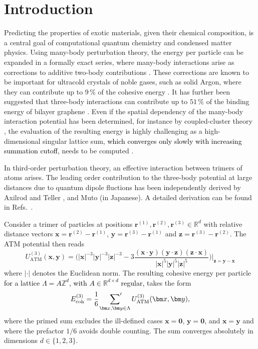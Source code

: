 \documentclass[]{amsart}
\numberwithin{mythm}{section}
\newcommand{\new}[1]{{\textcolor{black}{#1}}}
\begin{document}
\maketitle

\section{Introduction}

Predicting the properties of exotic materials, given their chemical composition, is a central goal of computational quantum chemistry and condensed matter physics. Using many-body perturbation theory, the energy per particle can be expanded in a formally exact series, where many-body interactions arise as corrections to additive two-body contributions \cite{muser2023interatomic}. These corrections are known to be important for ultracold crystals of noble gases, such as solid Argon, where they can contribute up to 9\,\% of the cohesive energy \cite{schwerdtfeger2016towards}. It has further been suggested that three-body interactions can contribute up to $51\,\%$ of the binding energy of bilayer graphene \cite{anatole2010two}. Even if the spatial dependency of the many-body interaction potential has been determined, for instance by coupled-cluster theory \cite{smits2020first}, the evaluation of the resulting energy is highly challenging as a high-dimensional singular lattice sum, \new{which converges only slowly with increasing summation cutoff,} needs to be computed \cite{hermannConvergenceManybodyExpansion2007}.

In third-order perturbation theory, an effective interaction between trimers of atoms arises. 
The leading order contribution to the three-body potential at large distances due to quantum dipole fluctions has been independently derived by Axilrod and Teller 
\cite{axilrod1943interaction}, and Muto \cite{muto1943force} (in Japanese). A detailed derivation can be found in Refs.~\cite{bade1957drude,axilrod1951triple,bell1970multipolar}.
\begin{definition}
\label{def:atm}
Consider a trimer of particles at positions $\bm r^{(1)},\bm r^{(2)},\bm r^{(3)}\in \mathds R^d$ with relative distance vectors $\bm x= \bm r^{(2)}-\bm r^{(1)}$, $\bm y= \bm r^{(3)}-\bm r^{(1)}$ and $\bm z=\bm r^{(3)}-\bm r^{(2)}$. The ATM potential then reads
\[
U^{(3)}_{\mathrm{ATM}}(\bm x,\bm y) = \bigg(\vert \bm x \vert^{-3}\vert \bm y \vert^{-3}\vert \bm  z\vert^{-3} - 3 \frac{(\bm x\cdot \bm y)(\bm y\cdot \bm z)(\bm z\cdot \bm x)}{\vert \bm x \vert^{5}\vert \bm y \vert^{5}\vert \bm  z\vert^{5}}\bigg)\bigg\vert_{\bm z=\bm y-\bm x}
\]
where $|\bm \cdot|$ denotes the Euclidean norm.
 The resulting cohesive energy per particle \new{for a lattice $\Lambda=A\mathds Z^d$, with $A\in \mathds R^{d\times d}$ regular,} takes the form
\[
E_{\mathrm{coh}}^{(3)} = \frac{1}{6}\,\sideset{}{'}\sum_{\bm x,\bm y \in  \Lambda} U^{(3)}_{\mathrm{ATM}}(\bm x,\bm y),
\]
where the primed sum excludes the ill-defined cases $\bm  x= \bm 0$, $\bm y = \bm  0$, and $\bm x=\bm y$ and where the prefactor $1/6$ avoids double counting. The sum converges absolutely in dimensions $d\in \{1,2,3\}$.
\end{definition} 
\end{document}
